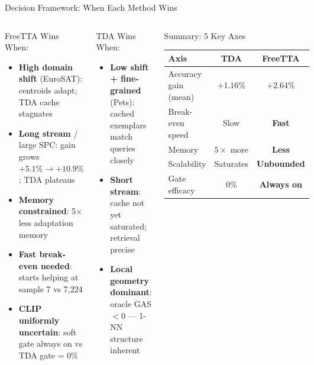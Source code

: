 \documentclass[aspectratio=169,11pt]{beamer}
\begin{document}
\begin{frame}{Decision Framework: When Each Method Wins}
\begin{columns}[T]
  \begin{exampleblock}{FreeTTA Wins When:}
    \begin{itemize}\footnotesize\setlength{\itemsep}{2pt}
      \item \textbf{High domain shift} (EuroSAT): centroids adapt; TDA cache stagnates
      \item \textbf{Long stream} / large SPC: gain grows $+5.1\%{\to}+10.9\%$; TDA plateaus
      \item \textbf{Memory constrained}: 5$\times$ less adaptation memory
      \item \textbf{Fast break-even needed}: starts helping at sample 7 vs 7,224
      \item \textbf{CLIP uniformly uncertain}: soft gate always on vs TDA gate = 0\%
    \end{itemize}
  \end{exampleblock}
  \begin{alertblock}{TDA Wins When:}
    \begin{itemize}\footnotesize\setlength{\itemsep}{2pt}
      \item \textbf{Low shift + fine-grained} (Pets): cached exemplars match queries closely
      \item \textbf{Short stream}: cache not yet saturated; retrieval precise
      \item \textbf{Local geometry dominant}: oracle GAS $<0$ — 1-NN structure inherent
    \end{itemize}
  \end{alertblock}
  \vspace{4pt}
  \begin{block}{\footnotesize Summary: 5 Key Axes}
    \scriptsize
    \begin{tabular}{lcc}
      \toprule
      Axis & TDA & FreeTTA\\
      \midrule
      Accuracy gain (mean) & $+1.16$\% & $\mathbf{+2.64}$\%\\
      Break-even speed & Slow & \textbf{Fast}\\
      Memory & $5\times$ more & \textbf{Less}\\
      Scalability & Saturates & \textbf{Unbounded}\\
      Gate efficacy & 0\% & \textbf{Always on}\\
      \bottomrule
    \end{tabular}
  \end{block}
\end{columns}
\end{frame}
\end{document}
